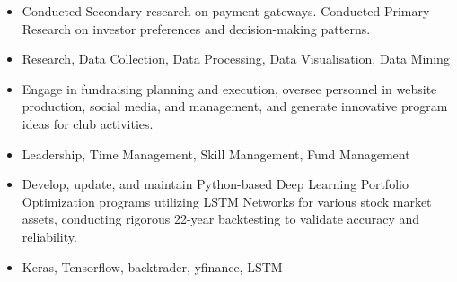 \documentclass[10pt,a4paper,ragged2e,withhyper,total={8.3in, 11.7in}]{altacv}
\begin{document}
\begin{paracol}{2}


\begin{itemize}
\item Conducted Secondary research on payment gateways. Conducted Primary Research on investor preferences and decision-making patterns.
\item Research, Data Collection, Data Processing, Data Visualisation, Data Mining

\end{itemize}

\begin{itemize}
\item Engage in fundraising planning and execution, oversee personnel in website production, social media, and management, and generate innovative program ideas for club activities.
\item Leadership, Time Management, Skill Management, Fund Management
\end{itemize}







\begin{itemize}
\item Develop, update, and maintain Python-based Deep Learning Portfolio Optimization programs utilizing LSTM Networks for various stock market assets, conducting rigorous 22-year backtesting to validate accuracy and reliability.
\item Keras, Tensorflow, backtrader, yfinance, LSTM
\end{itemize}


\end{paracol}
\end{document}

